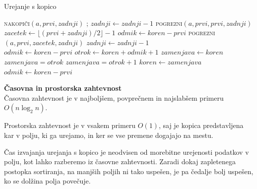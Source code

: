 \documentclass[a4paper,oneside,10pt]{article}
\newcommand{\subsubsubsection}[1]{\vspace*{1ex}\textbf{#1}\\}
\begin{document}
\begin{algorithm}
  \caption{Urejanje s kopico}\label{algo:heapsort}
  \begin{algorithmic}[1]
        \State \textsc{nakopiči}$(a, prvi, zadnji)$
            ;
            \State $zadnji \gets zadnji - 1$
            \State \textsc{pogrezni}$(a, prvi, prvi, zadnji)$
        \EndWhile
    \EndFunction
    \\
        \State $zacetek \gets \lfloor(prvi + zadnji) / 2\rfloor - 1$
         
            \State $odmik \gets koren - prvi$
            \State \textsc{pogrezni}$(a, prvi, zacetek, zadnji)$
            \State $zadnji \gets zadnji - 1$
        \EndWhile
    \EndFunction
    \\
        \State $odmik \gets koren - prvi$
         
            \State $otrok \gets koren + odmik + 1$
            \State $zamenjava \gets koren$ 
             
            \State $zamenjava = otrok$
            \EndIf {}
                \State $zamenjava = otrok + 1$
            \EndIf
                \State $koren \gets zamenjava$
                \State $odmik \gets koren - prvi$
            \Else
                \State \Return 
            \EndIf
        \EndWhile
    \EndFunction
  \end{algorithmic}
\end{algorithm}

\subsubsubsection{Časovna in prostorska zahtevnost}
Časovna zahtevnost je v najboljšem, povprečnem in najslabšem primeru $O(n\log_2 n)$.

Prostorska zahtevnost je v vsakem primeru $O(1)$, saj je kopica predstavljena kar v
polju, ki ga urejamo, in ker se vse premene dogajajo na mestu.

Čas izvajanja urejanja s kopico je neodvisen od morebitne urejenosti podatkov v polju,
kot lahko razberemo iz časovne zahtevnosti. Zaradi dokaj zapletenega postopka sortiranja,
na manjših poljih ni tako uspešen, je pa čedalje bolj uspešen, ko se dolžina polja
povečuje.
\end{document}
